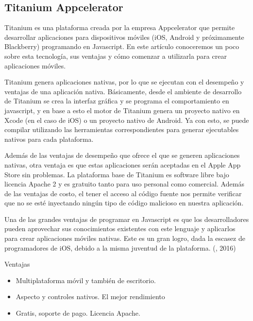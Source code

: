 \subsection{Titanium Appcelerator}

\setlength{\parskip}{5mm}
Titanium es una plataforma creada por la empresa Appcelerator que permite desarrollar aplicaciones para dispositivos móviles (iOS, Android y próximamente Blackberry) programando en Javascript. En este artículo conoceremos un poco sobre esta tecnología, sus ventajas y cómo comenzar a utilizarla para crear aplicaciones móviles.

Titanium genera aplicaciones nativas, por lo que se ejecutan con el desempeño y ventajas de una aplicación nativa. Básicamente, desde el ambiente de desarrollo de Titanium se crea la interfaz gráfica y se programa el comportamiento en javascript, y en base a esto el motor de Titanium genera un proyecto nativo en Xcode (en el caso de iOS) o un proyecto nativo de Android. Ya con esto, se puede compilar utilizando las herramientas correspondientes para generar ejecutables nativos para cada plataforma.

Además de las ventajas de desempeño que ofrece el que se generen aplicaciones nativas, otra ventaja es que estas aplicaciones serán aceptadas en el Apple App Store sin problemas.
La plataforma base de Titanium es software libre bajo licencia Apache 2 y es gratuito tanto para uso personal como comercial. Además de las ventajas de costo, el tener el acceso al código fuente nos permite verificar que no se esté inyectando ningún tipo de código malicioso en nuestra aplicación.

Una de las grandes ventajas de programar en Javascript es que los desarrolladores pueden aprovechar sus conocimientos existentes con este lenguaje y aplicarlos para crear aplicaciones móviles nativas. Este es un gran logro, dada la escasez de programadores de iOS, debido a la misma juventud de la plataforma. (\citet{titaniumbib}, 2016)

Ventajas
\setlength{\parskip}{0mm}
\begin{itemize}

    \item Multiplataforma móvil y también de escritorio.
    
    \item Aspecto y controles nativos. El mejor rendimiento
    
    \item Gratis, soporte de pago. Licencia Apache.

\end{itemize}

